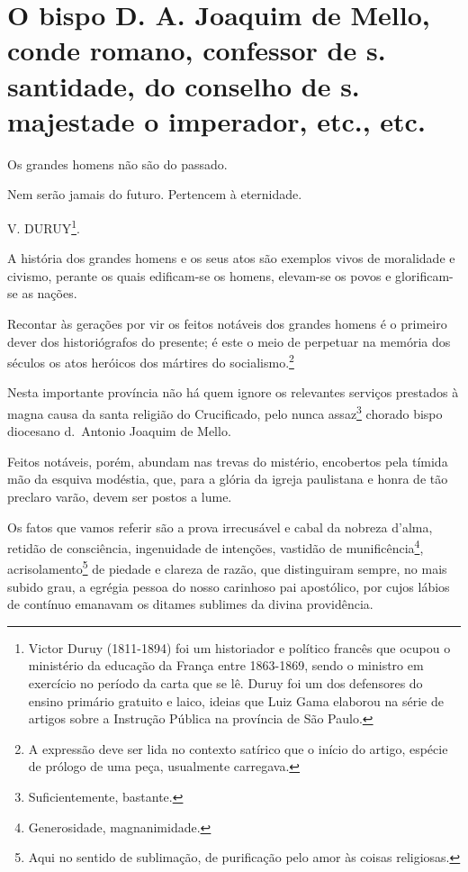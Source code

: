 \asterisc{}

\section{O bispo D. A. Joaquim de Mello, conde romano, confessor de
s. santidade, do conselho de s. majestade o imperador, etc., etc.}

Os grandes homens não são do passado.

Nem serão jamais do futuro. Pertencem à eternidade.

V. DURUY\footnote{Victor Duruy (1811-1894) foi um historiador e
  político francês que ocupou o ministério da educação da França entre
  1863-1869, sendo o ministro em exercício no período da carta que se
  lê. Duruy foi um dos defensores do ensino primário gratuito e laico,
  ideias que Luiz Gama elaborou na série de artigos sobre a Instrução
  Pública na província de São Paulo.}.

A história dos grandes homens e os seus atos são exemplos vivos de
moralidade e civismo, perante os quais edificam-se os homens, elevam-se
os povos e glorificam-se as nações.

Recontar às gerações por vir os feitos notáveis dos grandes homens é o
primeiro dever dos historiógrafos do presente; é este o meio de
perpetuar na memória dos séculos os atos heróicos dos mártires do
socialismo.\footnote{A expressão deve ser lida no contexto satírico
  que o início do artigo, espécie de prólogo de uma peça, usualmente
  carregava.}

Nesta importante província não há quem ignore os relevantes serviços
prestados à magna causa da santa religião do Crucificado, pelo nunca
assaz\footnote{Suficientemente, bastante.} chorado bispo diocesano
d.~Antonio Joaquim de Mello.

Feitos notáveis, porém, abundam nas trevas do mistério, encobertos pela
tímida mão da esquiva modéstia, que, para a glória da igreja paulistana
e honra de tão preclaro varão, devem ser postos a lume.

Os fatos que vamos referir são a prova irrecusável e cabal da nobreza
d'alma, retidão de consciência, ingenuidade de intenções, vastidão de
munificência\footnote{Generosidade, magnanimidade.},
acrisolamento\footnote{Aqui no sentido de sublimação, de purificação
  pelo amor às coisas religiosas.} de piedade e clareza de razão, que
distinguiram sempre, no mais subido grau, a egrégia pessoa do nosso
carinhoso pai apostólico, por cujos lábios de contínuo emanavam os
ditames sublimes da divina providência.

